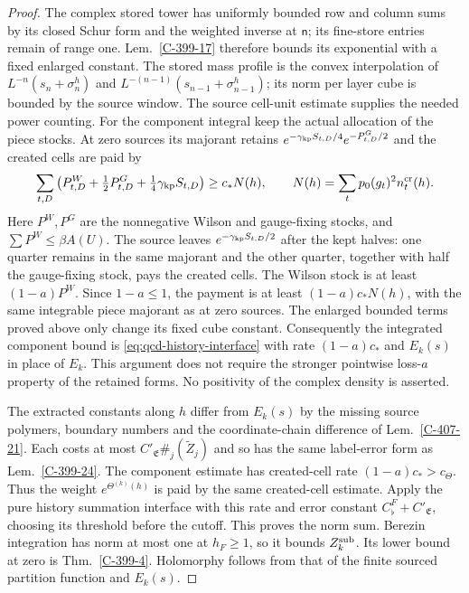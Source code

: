 \documentclass[11pt,letterpaper,reqno]{amsart}
\theoremstyle{definition}
\theoremstyle{remark}
\begin{document}
\begin{proof}
The complex stored tower has uniformly bounded row and
column sums by its closed Schur form and the weighted
inverse at $\mathsf n$; its fine-store entries remain
of range one. Lem.~\ref{C-399-17} therefore bounds its
exponential with a fixed enlarged constant. The stored
mass profile is the convex interpolation of
$L^{-n}(s_n+\sigma_n^h)$ and
$L^{-(n-1)}(s_{n-1}+\sigma_{n-1}^h)$; its norm per
layer cube is bounded by the source window. The source
cell-unit estimate supplies the needed power counting.
For the component integral keep the actual allocation of the
piece stocks. At zero sources its majorant retains
$e^{-\gamma_{\rm kp}S_{t,D}/4}e^{-P^G_{t,D}/2}$ and
the created cells are paid by
\[
 \sum_{t,D}\left(P^W_{t,D}+\tfrac12P^G_{t,D}
                      +\tfrac14\gamma_{\rm kp}S_{t,D}\right)
       \ge c_*N(h),\qquad
 N(h)=\sum_t p_0(g_t)^2 n_t^{\rm cr}(h).
\]
Here $P^W,P^G$ are the nonnegative Wilson and gauge-fixing
stocks, and $\sum P^W\le\beta A(U)$. The source leaves
$e^{-\gamma_{\rm kp}S_{t,D}/2}$ after the kept halves:
one quarter remains in the same majorant and the other
quarter, together with half the gauge-fixing stock, pays
the created cells. The Wilson stock is at least
$(1-a)P^W$. Since $1-a\le1$, the payment is at least
$(1-a)c_*N(h)$, with the same integrable piece majorant
as at zero sources. The enlarged bounded terms proved
above only change its fixed cube constant. Consequently
the integrated component bound is
\eqref{eq:qcd-history-interface} with rate $(1-a)c_*$
and $E_k(s)$ in place of $E_k$. This argument does not
require the stronger pointwise loss-$a$ property of
the retained forms. No positivity of the complex density
is asserted.

The extracted constants along $h$ differ from $E_k(s)$
by the missing source polymers, boundary numbers and
the coordinate-chain difference of
Lem.~\ref{C-407-21}. Each costs at most
$C'_{\mathfrak E}\#_j(\widetilde Z_j)$ and so has the
same label-error form as Lem.~\ref{C-399-24}.
The component estimate has created-cell rate
$(1-a)c_*>c_\Theta$. Thus the weight $e^{\Theta^{(k)}(h)}$
is paid by the same created-cell estimate. Apply the pure history summation interface
with this rate and error constant
$C_\flat^F+C'_{\mathfrak E}$, choosing its threshold
before the cutoff. This proves the norm sum.
Berezin integration has norm at most one at $h_F\ge1$,
so it bounds $Z_k^{\rm sub}$. Its lower bound at zero
is Thm.~\ref{C-399-4}. Holomorphy follows from that
of the finite sourced partition function and $E_k(s)$.
\end{proof}
\end{document}
